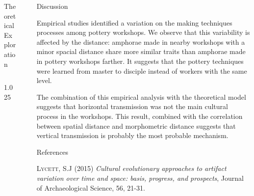 \documentclass[final]{beamer}
\newlength{\sepwid}
\newlength{\onecolwid}
\newlength{\twocolwid}
\begin{document}
\begin{frame}[t]
\begin{columns}[t]
\begin{column}{\twocolwid}
\begin{block}{Theoretical Exploration}
\begin{columns}[t,totalwidth=\twocolwid]
\begin{column}{1.025\onecolwid}
    
\end{column}
\end{columns}

\end{block}
\end{column}


\begin{column}{\sepwid}\end{column} %

\begin{column}{\onecolwid} %

\begin{block}{Discussion}
\justify

Empirical studies identified a variation on the making techniques processes among pottery workshops. We observe that this variability is affected by the distance: amphorae made in nearby workshops with a minor spacial distance share more similar traits than amphorae made in pottery workshops farther. It suggests that the pottery techniques were learned from master to disciple instead of workers with the same level. 

The combination of this empirical analysis with the theoretical model suggests that horizontal transmission was not the main cultural process in the workshops. This result, combined with the correlation between spatial distance and morphometric distance suggests that vertical transmission is probably the most probable mechanism.



 
\end{block}

\begin{block}{References}
\small

\begin{thebibliography}{50}


\textsc{Lycett, S.J (2015)}
\textit{Cultural evolutionary approaches to artifact variation over time and space: basis, progress, and prospects}, Journal of Archaeological Science, 56, 21-31.


\end{thebibliography}
\end{block}
\end{column}
\end{columns}
\end{frame}
\end{document}

